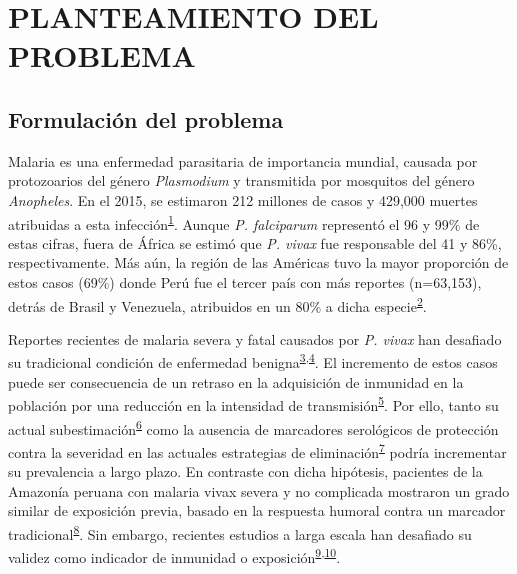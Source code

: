 \documentclass[]{article}
\begin{document}
\section{PLANTEAMIENTO DEL PROBLEMA}\label{planteamiento-del-problema}

\subsection{Formulación del problema}\label{intro}

Malaria es una enfermedad parasitaria de importancia mundial, causada
por protozoarios del género \emph{Plasmodium} y transmitida por
mosquitos del género \emph{Anopheles}. En el 2015, se estimaron 212
millones de casos y 429,000 muertes atribuidas a esta
infección\textsuperscript{\protect\hyperlink{ref-WHO2016world}{1}}.
Aunque \emph{P. falciparum} representó el 96 y 99\% de estas cifras,
fuera de África se estimó que \emph{P. vivax} fue responsable del 41 y
86\%, respectivamente. Más aún, la región de las Américas tuvo la mayor
proporción de estos casos (69\%) donde Perú fue el tercer país con más
reportes (n=63,153), detrás de Brasil y Venezuela, atribuidos en un 80\%
a dicha
especie\textsuperscript{\protect\hyperlink{ref-rosas2016peru}{2}}.

Reportes recientes de malaria severa y fatal causados por \emph{P.
vivax} han desafiado su tradicional condición de enfermedad
benigna\textsuperscript{\protect\hyperlink{ref-baird2009}{3},\protect\hyperlink{ref-quispe2014}{4}}.
El incremento de estos casos puede ser consecuencia de un retraso en la
adquisición de inmunidad en la población por una reducción en la
intensidad de
transmisión\textsuperscript{\protect\hyperlink{ref-reyburn2015}{5}}. Por
ello, tanto su actual
subestimación\textsuperscript{\protect\hyperlink{ref-norma2001}{6}} como
la ausencia de marcadores serológicos de protección contra la severidad
en las actuales estrategias de
eliminación\textsuperscript{\protect\hyperlink{ref-accelerate2016}{7}}
podría incrementar su prevalencia a largo plazo. En contraste con dicha
hipótesis, pacientes de la Amazonía peruana con malaria vivax severa y
no complicada mostraron un grado similar de exposición previa, basado en
la respuesta humoral contra un marcador
tradicional\textsuperscript{\protect\hyperlink{ref-baldevi2013}{8}}. Sin
embargo, recientes estudios a larga escala han desafiado su validez como
indicador de inmunidad o
exposición\textsuperscript{\protect\hyperlink{ref-crompton2010}{9},\protect\hyperlink{ref-Helb2015exposure}{10}}.
\end{document}
